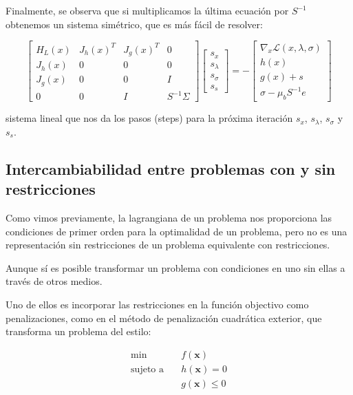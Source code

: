 Finalmente, se observa que si multiplicamos la última ecuación por $S^{-1}$
obtenemos un sistema simétrico, que es más fácil de resolver:

\begin{equation}
	\begin{bmatrix}
		H_L(x) & J_h(x)^T & J_g(x)^T & 0            \\
		J_h(x) & 0        & 0        & 0            \\
		J_g(x) & 0        & 0        & I            \\
		0      & 0        & I        & S^{-1}\Sigma
	\end{bmatrix}
	\begin{bmatrix}
		s_x       \\
		s_\lambda \\
		s_\sigma  \\
		s_s
	\end{bmatrix}
	= -
	\begin{bmatrix}
		\nabla_x \mathcal{L}(x, \lambda, \sigma) \\
		h(x)                                     \\
		g(x) + s                                 \\
		\sigma - \mu_b S^{-1}e
	\end{bmatrix}
\end{equation}

sistema lineal que nos da los pasos (steps) para la próxima iteración $s_x$,
$s_\lambda$, $s_\sigma$ y  $s_s$.

\subsection{Intercambiabilidad entre problemas con y sin restricciones}

Como vimos previamente, la lagrangiana de un problema nos proporciona las
condiciones de primer orden para la optimalidad de un problema, pero no es una
representación sin restricciones de un problema equivalente con restricciones.

Aunque sí es posible transformar un problema con condiciones en uno sin ellas a
través de otros medios.

Uno de ellos es incorporar las restricciones en la función objectivo como
penalizaciones, como en el método de penalización cuadrática exterior, que
transforma un problema del estilo:

\begin{align}
	\min \quad            & f(\mathbf{x})         \\
	\text{sujeto a} \quad & h(\mathbf{x}) = 0     \\
	                      & g(\mathbf{x}) \leq  0
\end{align}

